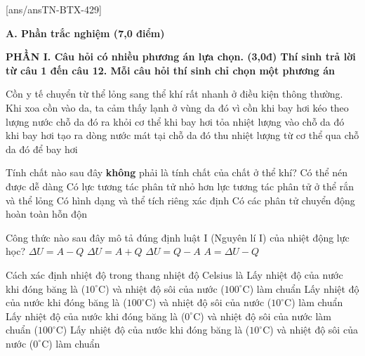 [ans/ansTN-BTX-429]

\noindent \textbf{A. Phần trắc nghiệm (7,0 điểm)}

\noindent \textbf{PHẦN I. Câu hỏi có nhiều phương án lựa chọn. (3,0đ) Thí sinh trả lời từ câu 1 đến câu 12. Mỗi câu hỏi thí sinh chỉ chọn một phương án}
\vspace{0.2cm}

\begin{ex}	Cồn y tế chuyển từ thể lỏng sang thể khí rất nhanh ở điều kiện thông thường. Khi xoa cồn vào da, ta cảm thấy lạnh ở vùng da đó vì cồn
	\choice
	{khi bay hơi kéo theo lượng nước chỗ da đó ra khỏi cơ thể}
	{khi bay hơi tỏa nhiệt lượng vào chỗ da đó}
	{khi bay hơi tạo ra dòng nước mát tại chỗ da đó}
	{\True thu nhiệt lượng từ cơ thể qua chỗ da đó để bay hơi}
\end{ex}

\begin{ex}	Tính chất nào sau đây \textbf{không} phải là tính chất của chất ở thể khí?
	\choice
	{Có thể nén được dễ dàng}
	{Có lực tương tác phân tử nhỏ hơn lực tương tác phân tử ở thể rắn và thể lỏng}
	{\True Có hình dạng và thể tích riêng xác định}
	{Có các phân tử chuyển động hoàn toàn hỗn độn}
\end{ex}

\begin{ex}	Công thức nào sau đây mô tả đúng định luật I (Nguyên lí I) của nhiệt động lực học?
	\choice
	{$\Delta U=A-Q$}
	{\True $\Delta U=A+Q$}
	{$\Delta U=Q-A$}
	{$A=\Delta U-Q$}
\end{ex}

\begin{ex}	Cách xác định nhiệt độ trong thang nhiệt độ Celsius là
	\choice
	{Lấy nhiệt độ của nước khi đóng băng là ($10^\circ\text{C}$) và nhiệt độ sôi của nước ($100^\circ\text{C}$) làm chuẩn}
	{Lấy nhiệt độ của nước khi đóng băng là ($100^\circ\text{C}$) và nhiệt độ sôi của nước ($10^\circ\text{C}$) làm chuẩn}
	{\True Lấy nhiệt độ của nước khi đóng băng là ($0^\circ\text{C}$) và nhiệt độ sôi của nước làm chuẩn ($100^\circ\text{C}$)}
	{Lấy nhiệt độ của nước khi đóng băng là ($10^\circ\text{C}$) và nhiệt độ sôi của nước ($0^\circ\text{C}$) làm chuẩn}
\end{ex}

